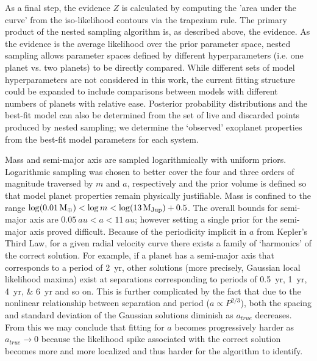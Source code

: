 \documentclass[12pt,manuscript]{aastex}
\begin{document}
As a final step, the evidence $Z$ is calculated by computing the 'area under the curve' from the iso-likelihood contours via the trapezium rule.
The primary product of the nested sampling algorithm is, as described above, the evidence.
As the evidence is the average likelihood over the prior parameter space, nested sampling allows parameter spaces defined by different hyperparameters (i.e. one planet vs. two planets) to be directly compared.
While different sets of model hyperparameters are not considered in this work, the current fitting structure could be expanded to include comparisons between models with different numbers of planets with relative ease.
Posterior probability distributions and the best-fit model can also be determined from the set of live and discarded points produced by nested sampling; we determine the `observed' exoplanet properties from the best-fit model parameters for each system.

Mass and semi-major axis are sampled logarithmically with uniform priors.
Logarithmic sampling was chosen to better cover the four and three orders of magnitude traversed by $m$ and $a$, respectively and the prior volume is defined so that model planet properties remain physically justifiable.
Mass is confined to the range $\log(\SI{0.01}{M_\oplus}) < \log m < \log (\SI{13}{M_{Jup}}) + 0.5$.
The overall bounds for semi-major axis are $\SI{0.05}{au} < a < \SI{11}{au}$; however setting a single prior for the semi-major axis proved difficult.
Because of the periodicity implicit in $a$ from Kepler's Third Law, for a given radial velocity curve there exists a family of `harmonics' of the correct solution.
For example, if a planet has a semi-major axis that corresponds to a period of \SI{2}{yr}, other solutions (more precisely, Gaussian local likelihood maxima) exist at separations corresponding to periods of \SIlist[list-final-separator={, }] {0.5;1;4;6}{yr} and so on.
This is further complicated by the fact that due to the nonlinear relationship between separation and period ($a \propto P^{2/3}$), both the spacing and standard deviation of the Gaussian solutions diminish as $a_{true}$ decreases. 
From this we may conclude that fitting for $a$ becomes progressively harder as $a_{true} \to 0$ because the likelihood spike associated with the correct solution becomes more and more localized and thus harder for the algorithm to identify.
\end{document}
